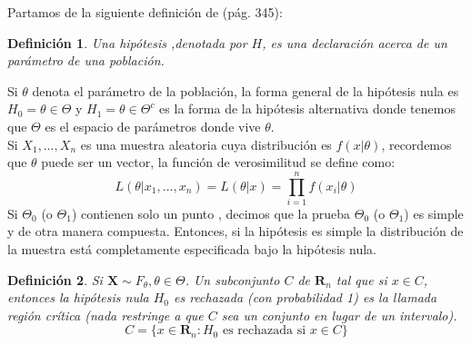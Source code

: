 \documentclass[peerreview]{IEEEtran}
\newtheorem{definition}{Definición}
\begin{document}
Partamos de la siguiente definición de \cite{Casella} (pág. 345): 
\begin{definition}
Una \textit{hipótesis ,denotada por $H$, es una declaración acerca de un parámetro de una población}.
\end{definition}
Si $\theta$ denota el parámetro de la población, la forma general de la hipótesis nula es $H_0 =\theta \in  \Theta$ y $H_1 = \theta \in \Theta^c$ es la forma de la hipótesis alternativa donde tenemos que
$\Theta$ es el espacio de parámetros donde vive  $\theta$.\\
Si $X_1, \dots, X_n$ es una muestra aleatoria cuya distribución es $f(x|\theta)$, recordemos que $\theta$ puede ser un vector, la función de verosimilitud se define como:
\[
L(\theta | x_1, \dots, x_n)=L(\theta|x)=\prod_{i=1}^n f(x_i|\theta)
\]
Si $\Theta_0$ (o $\Theta_1$) contienen solo un punto , decimos que la prueba $\Theta_0$ (o $\Theta_1$) es simple y de otra manera compuesta. Entonces, si la hipótesis es simple la distribución de la muestra está completamente especificada bajo la hipótesis nula.
\begin{definition}
Si $\mathbf{X} \sim F_\theta, \theta \in \Theta$. Un subconjunto $C$ de $\mathbf{R}_n$ tal que si $x \in C$, entonces la hipótesis nula $H_0$ es rechazada (con probabilidad 1) es la llamada región crítica (nada restringe a que $C$ sea un conjunto en lugar de un intervalo).
\[
C=\{x \in \mathbf{R}_n: H_0 \textrm{ es rechazada si }x \in C\}
\] 
\end{definition}
\end{document}
